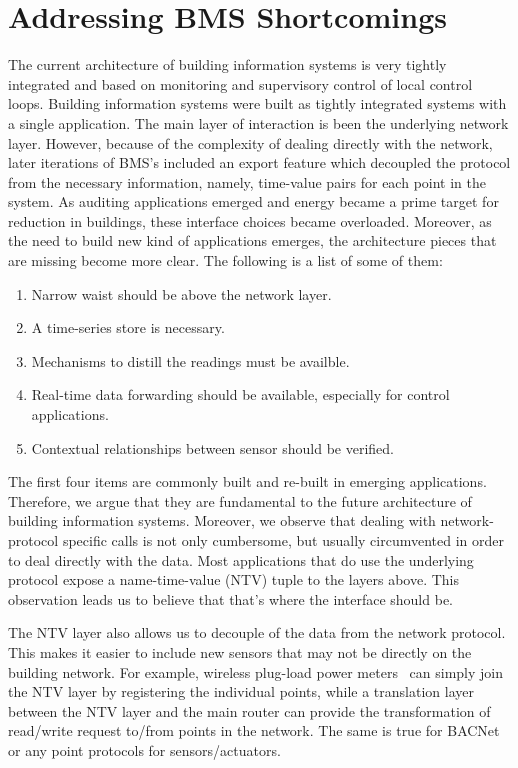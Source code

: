 
\section{Addressing BMS Shortcomings}
\label{sec:shortcomings}
The current architecture of building information systems is very tightly integrated and based on monitoring and supervisory control
of local control loops.  Building information systems were built as tightly integrated systems with a single application.  The main
layer of interaction is been the underlying network layer.  However, because of the complexity of dealing directly with the network,
later iterations of BMS's included an export feature which decoupled the protocol from the necessary information, namely, time-value
pairs for each point in the system.  As auditing applications emerged and energy became a prime target for reduction in buildings, 
these interface choices became overloaded.  Moreover, as the need to build new kind of applications emerges, the architecture pieces
that are missing become more clear.  The following is a list of some of them:

\begin{enumerate}
\item Narrow waist should be above the network layer. \label{nw}
\item A time-series store is necessary. \label{ts}
\item Mechanisms to distill the readings must be availble. \label{proc}
\item Real-time data forwarding should be available, especially for control applications. \label{rt}
\item Contextual relationships between sensor should be verified. \label{cntxt}
\end{enumerate}

The first four items are commonly built and re-built in emerging applications.  Therefore, we argue that they are fundamental 
to the future architecture of building information systems.  Moreover, we observe that dealing with network-protocol specific
calls is not only cumbersome, but usually circumvented in order to deal directly with the data.  Most applications that do
use the underlying protocol expose a name-time-value (NTV) tuple to the layers above.  This observation leads us to believe that
that's where the interface should be.

The NTV layer also allows us to decouple of the data from the network protocol.  This makes it easier to include 
new sensors that may not be directly on the building network.  For example, wireless plug-load power meters~\cite{ACme}
can simply join the NTV layer by registering the individual points, while a translation layer between the NTV layer and the
main router can provide the transformation of read/write request to/from points in the network.  The same is true for BACNet
or any point protocols for sensors/actuators.

